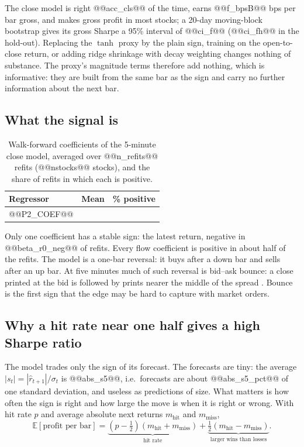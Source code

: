 \documentclass[11pt,a4paper]{article}
\newcommand{\E}{\mathbb{E}}
\begin{document}
The close model is right @@acc_cls@@ of the time, earns @@f_bpsB@@ bps per bar gross, and makes gross profit
in most stocks; a 20-day moving-block bootstrap gives its gross Sharpe a 95\% interval of @@ci_f@@ (@@ci_fh@@ in the hold-out). Replacing the $\tanh$ proxy by the plain sign, training on the open-to-close return, or
adding ridge shrinkage with decay weighting changes nothing of substance. The proxy's magnitude terms therefore add nothing, which is informative: they are built from the same bar as the sign and carry no
further information about the next bar.

\subsection{What the signal is}
\label{sec:signal}

\begin{table}[htbp]
\centering
\caption{Walk-forward coefficients of the 5-minute close model, averaged over @@n_refits@@ refits
(@@nstocks@@ stocks), and the share of refits in which each is positive.}
\label{tab:coef}
\small
\begin{tabular}{@{}lrr@{}}
\toprule
Regressor & Mean & \% positive \\
\midrule
@@P2_COEF@@
\bottomrule
\end{tabular}
\end{table}

Only one coefficient has a stable sign: the latest return, negative in @@beta_r0_neg@@ of refits. Every
flow coefficient is positive in about half of the refits. The model is a one-bar reversal: it buys after a
down bar and sells after an up bar. At five minutes much of such reversal is bid--ask bounce: a close
printed at the bid is followed by prints nearer the middle of the spread \citep{roll1984}. Bounce is the first sign that the edge may be hard to capture with market orders.

\subsection{Why a hit rate near one half gives a high Sharpe ratio}
\label{sec:why}

The model trades only the sign of its forecast. The forecasts are tiny: the average $|s_t|=|\hat r_{t+1}|/\sigma_t$ is @@abs_s5@@, i.e.\ forecasts are about
@@abs_s5_pct@@ of one standard deviation, and useless as predictions of size. What matters is how often the sign is right and how
large the move is when it is right or wrong. With hit rate $p$ and average absolute next returns
$m_{\text{hit}}$ and $m_{\text{miss}}$,
\[
\E[\text{profit per bar}] = \underbrace{(p-\tfrac12)(m_{\text{hit}}+m_{\text{miss}})}_{\text{hit rate}}
+ \underbrace{\tfrac12(m_{\text{hit}}-m_{\text{miss}})}_{\text{larger wins than losses}}.
\]
\end{document}
